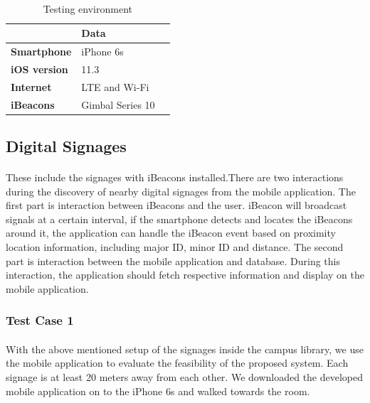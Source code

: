\documentclass[12pt]{article}
\begin{document}
\paragraph{}



\begin{table}%
    \centering
    
    \label{my-label4}
       \begin{tabular}{|p{30mm}|p{55mm}|p{35mm}|}
 \hline
  & \textbf{Data}  \\ [0.5ex] 
 \hline\hline
 \textbf{Smartphone} & iPhone 6s \\
 \hline
  \textbf {iOS version} & 11.3 \\
 \hline
 \textbf{Internet} & LTE  and Wi-Fi \\
 \hline
 \textbf{iBeacons} & Gimbal  Series 10  \\
 \hline
 
    \end{tabular}
    \caption{Testing environment } 
\end{table}

\subsection{Digital Signages }

\paragraph{}These include the signages with iBeacons installed.There are two interactions during the discovery of nearby digital signages from the mobile application. The first part is interaction between iBeacons and the user. iBeacon will broadcast signals at a certain interval, if the smartphone detects and locates the iBeacons around it,  the application can handle the iBeacon event based on proximity location information, including major ID, minor ID and distance. The second part is interaction between the mobile application and database. During this interaction, the application should fetch respective information and display on the mobile application.

\subsubsection{Test Case 1}
\label{oneone}
\paragraph{}With the above mentioned setup of the signages inside the campus library, we use the mobile application to evaluate the feasibility of the proposed system. Each signage is at least 20 meters away from each other. We downloaded the developed mobile application on to the iPhone 6s and walked towards the room.
\end{document}
